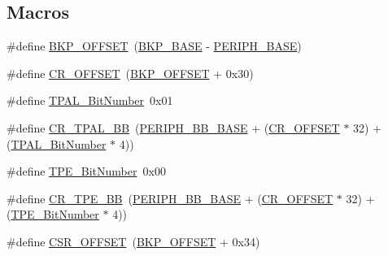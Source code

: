 \subsection*{Macros}
\begin{DoxyCompactItemize}
\item 
\#define \hyperlink{group___b_k_p___private___defines_gaaaf71f474657e7c0c5b0d6ba9697cf5d}{B\+K\+P\+\_\+\+O\+F\+F\+S\+ET}~(\hyperlink{openmotestm_2library_2inc_2stm32f10x__map_8h_aa15d5a9f40794105397ba5ea567c4ae1}{B\+K\+P\+\_\+\+B\+A\+SE} -\/ \hyperlink{openmotestm_2library_2inc_2stm32f10x__map_8h_a9171f49478fa86d932f89e78e73b88b0}{P\+E\+R\+I\+P\+H\+\_\+\+B\+A\+SE})
\item 
\#define \hyperlink{group___b_k_p___private___defines_gafa1d3d0ea72132df651c76fc1bdffffc}{C\+R\+\_\+\+O\+F\+F\+S\+ET}~(\hyperlink{openmotestm_2library_2src_2stm32f10x__bkp_8c_aaaf71f474657e7c0c5b0d6ba9697cf5d}{B\+K\+P\+\_\+\+O\+F\+F\+S\+ET} + 0x30)
\item 
\#define \hyperlink{group___b_k_p___private___defines_ga4af1869d665b8804104b6754c787820a}{T\+P\+A\+L\+\_\+\+Bit\+Number}~0x01
\item 
\#define \hyperlink{group___b_k_p___private___defines_gaa36e52f37b9fa6982bd224a6dcb86f78}{C\+R\+\_\+\+T\+P\+A\+L\+\_\+\+BB}~(\hyperlink{openmotestm_2library_2inc_2stm32f10x__map_8h_aed7efc100877000845c236ccdc9e144a}{P\+E\+R\+I\+P\+H\+\_\+\+B\+B\+\_\+\+B\+A\+SE} + (\hyperlink{openmotestm_2library_2src_2stm32f10x__rcc_8c_afa1d3d0ea72132df651c76fc1bdffffc}{C\+R\+\_\+\+O\+F\+F\+S\+ET} $\ast$ 32) + (\hyperlink{openmotestm_2library_2src_2stm32f10x__bkp_8c_a4af1869d665b8804104b6754c787820a}{T\+P\+A\+L\+\_\+\+Bit\+Number} $\ast$ 4))
\item 
\#define \hyperlink{group___b_k_p___private___defines_ga8c68be900246b028ff4af93ad119eb98}{T\+P\+E\+\_\+\+Bit\+Number}~0x00
\item 
\#define \hyperlink{group___b_k_p___private___defines_ga6c11e801c2c1aa87ec2feaefe12bbb96}{C\+R\+\_\+\+T\+P\+E\+\_\+\+BB}~(\hyperlink{openmotestm_2library_2inc_2stm32f10x__map_8h_aed7efc100877000845c236ccdc9e144a}{P\+E\+R\+I\+P\+H\+\_\+\+B\+B\+\_\+\+B\+A\+SE} + (\hyperlink{openmotestm_2library_2src_2stm32f10x__rcc_8c_afa1d3d0ea72132df651c76fc1bdffffc}{C\+R\+\_\+\+O\+F\+F\+S\+ET} $\ast$ 32) + (\hyperlink{openmotestm_2library_2src_2stm32f10x__bkp_8c_a8c68be900246b028ff4af93ad119eb98}{T\+P\+E\+\_\+\+Bit\+Number} $\ast$ 4))
\item 
\#define \hyperlink{group___b_k_p___private___defines_ga984cbe73312b6d3d355c5053763d499a}{C\+S\+R\+\_\+\+O\+F\+F\+S\+ET}~(\hyperlink{openmotestm_2library_2src_2stm32f10x__bkp_8c_aaaf71f474657e7c0c5b0d6ba9697cf5d}{B\+K\+P\+\_\+\+O\+F\+F\+S\+ET} + 0x34)

\end{DoxyCompactItemize}
